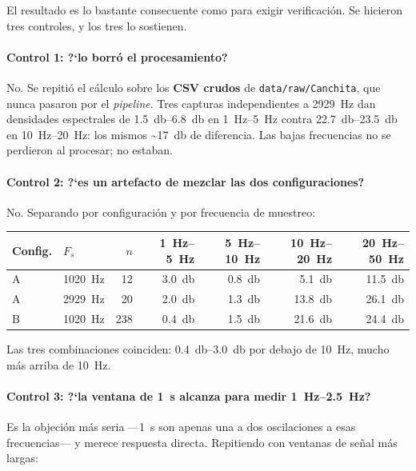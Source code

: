 El resultado es lo bastante consecuente como para exigir verificaci\'on. Se
hicieron tres controles, y los tres lo sostienen.

\paragraph{Control 1: ?`lo borr\'o el procesamiento?} No. Se repiti\'o el
c\'alculo sobre los \textbf{CSV crudos} de \texttt{data/raw/Canchita}, que nunca
pasaron por el \emph{pipeline}. Tres capturas independientes a
\SI{2929}{\hertz} dan densidades espectrales de \SIrange{1.5}{6.8}{\decibel} en
\SIrange{1}{5}{\hertz} contra \SIrange{22.7}{23.5}{\decibel} en
\SIrange{10}{20}{\hertz}: los mismos \textasciitilde{}\SI{17}{\decibel} de
diferencia. Las bajas frecuencias no se perdieron al procesar; no estaban.

\paragraph{Control 2: ?`es un artefacto de mezclar las dos configuraciones?} No.
Separando por configuraci\'on y por frecuencia de muestreo:

\begin{center}\footnotesize
\begin{tabular}{@{}llrrrrr@{}}
\toprule
Config. & $F_s$ & $n$ & \SIrange{1}{5}{\hertz} & \SIrange{5}{10}{\hertz} & \SIrange{10}{20}{\hertz} & \SIrange{20}{50}{\hertz} \\
\midrule
A & \SI{1020}{\hertz} & 12  & \SI{3.0}{\decibel} & \SI{0.8}{\decibel} & \SI{5.1}{\decibel}  & \SI{11.5}{\decibel} \\
A & \SI{2929}{\hertz} & 20  & \SI{2.0}{\decibel} & \SI{1.3}{\decibel} & \SI{13.8}{\decibel} & \SI{26.1}{\decibel} \\
B & \SI{1020}{\hertz} & 238 & \SI{0.4}{\decibel} & \SI{1.5}{\decibel} & \SI{21.6}{\decibel} & \SI{24.4}{\decibel} \\
\bottomrule
\end{tabular}
\end{center}

Las tres combinaciones coinciden: \SIrange{0.4}{3.0}{\decibel} por debajo de
\SI{10}{\hertz}, mucho m\'as arriba de \SI{10}{\hertz}.

\paragraph{Control 3: ?`la ventana de \SI{1}{\second} alcanza para medir
\SIrange{1}{2.5}{\hertz}?} Es la objeci\'on m\'as seria ---\SI{1}{\second} son
apenas una a dos oscilaciones a esas frecuencias--- y merece respuesta directa.
Repitiendo con ventanas de se\~nal m\'as largas:

